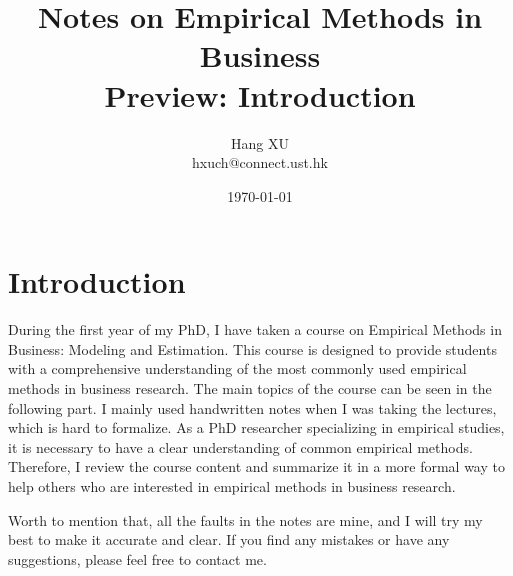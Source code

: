 \documentclass[a4paper]{article}
\begin{document}

\title{Notes on Empirical Methods in Business \\ Preview: Introduction}
\author{Hang XU \\hxuch@connect.ust.hk}
\date{\today}
\maketitle

\section{Introduction}
During the first year of my PhD, I have taken a course on Empirical Methods in Business: Modeling and Estimation. 
This course is designed to provide students with a comprehensive understanding of the most commonly used empirical methods in business research. The main topics of the course can be seen in the following part. 
I mainly used handwritten notes when I was taking the lectures, which is hard to formalize. As a PhD researcher specializing in empirical studies, it is necessary to have a clear understanding of common empirical methods.
Therefore, I review the course content and summarize it in a more formal way to help others who are interested in empirical methods in business research.

Worth to mention that, all the faults in the notes are mine, and I will try my best to make it accurate and clear. If you find any mistakes or have any suggestions, please feel free to contact me.
\end{document}
